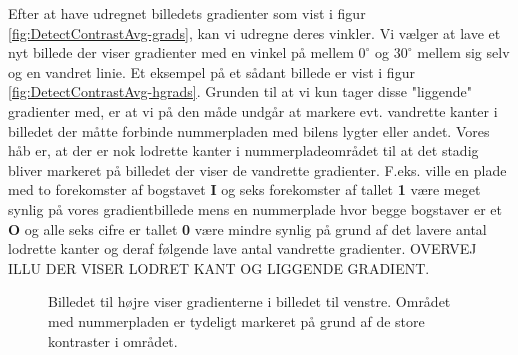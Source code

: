 Efter at have udregnet billedets gradienter som vist i figur \vref{fig:DetectContrastAvg-grads}, kan vi udregne deres vinkler. Vi vælger at lave et nyt billede der viser gradienter med en vinkel på mellem $0^{\circ}$ og $30^{\circ}$ mellem sig selv og en vandret linie. Et eksempel på et sådant billede er vist i figur \vref{fig:DetectContrastAvg-hgrads}. Grunden til at vi kun tager disse "liggende" gradienter med, er at vi på den måde undgår at markere evt. vandrette kanter i billedet der måtte forbinde nummerpladen med bilens lygter eller andet. Vores håb er, at der er nok lodrette kanter i nummerpladeområdet til at det stadig bliver markeret på billedet der viser de vandrette gradienter. F.eks. ville en plade med to forekomster af bogstavet \textbf{I} og seks forekomster af tallet \textbf{1} være meget synlig på vores gradientbillede mens en nummerplade hvor begge bogstaver er et \textbf{O} og alle seks cifre er tallet \textbf{0} være mindre synlig på grund af det lavere antal lodrette kanter og deraf følgende lave antal vandrette gradienter.
OVERVEJ ILLU DER VISER LODRET KANT OG LIGGENDE GRADIENT.
\begin{figure}[htbp]
  \centering
  \begin{minipage}[b]{5 cm}
  \end{minipage}
  \begin{minipage}[b]{5 cm}
  \end{minipage}
  \caption{Billedet til højre viser gradienterne i billedet til venstre. Området med nummerpladen er tydeligt markeret på grund af de store kontraster i området.}
  \label{fig:DetectContrastAvg-grads}
  \end{figure}

